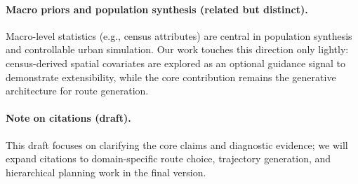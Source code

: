 \paragraph{Macro priors and population synthesis (related but distinct).}
Macro-level statistics (e.g., census attributes) are central in population synthesis and controllable urban simulation.
Our work touches this direction only lightly: census-derived spatial covariates are explored as an optional guidance signal to demonstrate extensibility, while the core contribution remains the generative architecture for route generation.

\paragraph{Note on citations (draft).}
This draft focuses on clarifying the core claims and diagnostic evidence; we will expand citations to domain-specific route choice, trajectory generation, and hierarchical planning work in the final version.
